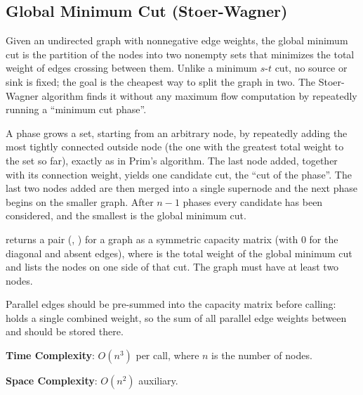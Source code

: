 \subsection{Global Minimum Cut (Stoer-Wagner)}
\label{sec:4.5.9}
Given an undirected graph with nonnegative edge weights, the global minimum cut is the partition of the nodes into two nonempty sets that minimizes the total weight of edges crossing between them. Unlike a minimum $s$-$t$ cut, no source or sink is fixed; the goal is the cheapest way to split the graph in two. The Stoer-Wagner algorithm finds it without any maximum flow computation by repeatedly running a ``minimum cut phase''.

A phase grows a set, starting from an arbitrary node, by repeatedly adding the most tightly connected outside node (the one with the greatest total weight to the set so far), exactly as in Prim's algorithm. The last node added, together with its connection weight, yields one candidate cut, the ``cut of the phase''. The last two nodes added are then merged into a single supernode and the next phase begins on the smaller graph. After $n - 1$ phases every candidate has been considered, and the smallest is the global minimum cut.

\begin{compactitem}
  \item {} returns a pair (, ) for a graph as a symmetric capacity matrix  (with $0$ for the diagonal and absent edges), where  is the total weight of the global minimum cut and  lists the nodes on one side of that cut. The graph must have at least two nodes.
\end{compactitem}

Parallel edges should be pre-summed into the capacity matrix before calling:  holds a single combined weight, so the sum of all parallel edge weights between  and  should be stored there.

\textbf{Time Complexity}: $O(n^{3})$ per call, where $n$ is the number of nodes.

\textbf{Space Complexity}: $O(n^{2})$ auxiliary.

